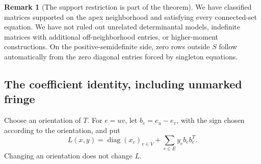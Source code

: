 \documentclass[11pt]{article}
\numberwithin{equation}{section}
\theoremstyle{definition}
\newtheorem{remark}[theorem]{Remark}
\newcommand{\diag}{\operatorname{diag}}
\begin{document}
\begin{remark}[The support restriction is part of the theorem]
We have classified matrices supported on the apex neighborhood and
satisfying every connected-set equation. We have not ruled out unrelated
determinantal models, indefinite matrices with additional off-neighborhood
entries, or higher-moment constructions. On the positive-semidefinite
side, zero rows outside $S$ follow automatically from the zero diagonal
entries forced by singleton equations.
\end{remark}

\subsection{The coefficient identity, including unmarked fringe}

Choose an orientation of $T$. For $e=uv$, let $b_e=e_u-e_v$, with the sign
chosen according to the orientation, and put
\begin{equation}
 L(x,y)=\diag(x_v)_{v\in V}+\sum_{e\in E}y_e b_eb_e^T.
 \label{mts:eq:L}
\end{equation}
Changing an orientation does not change $L$.
\end{document}
